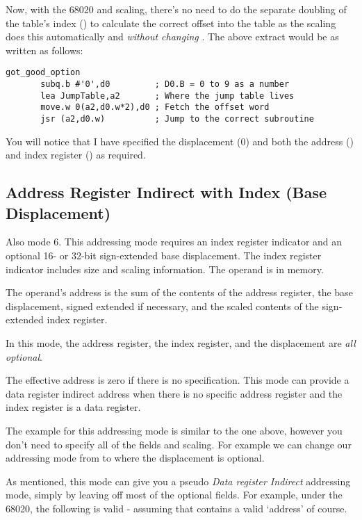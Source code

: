 Now, with the 68020 and scaling, there's no need to do the separate doubling of the table's index () to calculate the correct offset into the table as the scaling does this automatically and \emph{without changing }. The above extract would be as written as follows:

\begin{lstlisting}[firstnumber=1,caption={Jump Table - New Style}]
got_good_option
       subq.b #'0',d0         ; D0.B = 0 to 9 as a number
       lea JumpTable,a2       ; Where the jump table lives
       move.w 0(a2,d0.w*2),d0 ; Fetch the offset word
       jsr (a2,d0.w)          ; Jump to the correct subroutine
\end{lstlisting}       
       
You will notice that I have specified the displacement (0) and both the address () and index register () as required.


\subsection{Address Register Indirect with Index (Base Displacement)}\label{sub-ARegIIbd}
Also mode 6. This addressing mode requires an index register indicator and an optional 16- or 32-bit sign-extended base displacement. The index register indicator includes size and scaling information. The operand is in memory. 

The operand’s address is the sum of the contents of the address register, the base displacement, signed extended if necessary, and the scaled contents of the sign-extended index register.

In this mode, the address register, the index register, and the displacement are \emph{all optional}.

The effective address is zero if there is no specification. This mode can provide a data register indirect address when there is no specific address register and the index register is a data register.

The example for this addressing mode is similar to the one above, however you don't need to specify all of the fields and scaling. For example we can change our addressing mode from  to  where the displacement is optional.

As mentioned, this mode can give you a pseudo \emph{Data register Indirect} addressing mode, simply by leaving off most of the optional fields. For example, under the 68020, the following is valid  - assuming that  contains a valid `address' of course.

